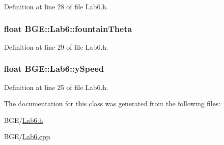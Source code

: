 Definition at line 28 of file Lab6.\-h.

\hypertarget{class_b_g_e_1_1_lab6_a15b7ff91181622d802d12b924c7b47ba}{
\subsubsection[{fountain\-Theta}]{\setlength{\rightskip}{0pt plus 5cm}float B\-G\-E\-::\-Lab6\-::fountain\-Theta}}\label{class_b_g_e_1_1_lab6_a15b7ff91181622d802d12b924c7b47ba}


Definition at line 29 of file Lab6.\-h.

\hypertarget{class_b_g_e_1_1_lab6_aaf30f90a1ae7641d70a128e1d1ba528f}{
\subsubsection[{y\-Speed}]{\setlength{\rightskip}{0pt plus 5cm}float B\-G\-E\-::\-Lab6\-::y\-Speed}}\label{class_b_g_e_1_1_lab6_aaf30f90a1ae7641d70a128e1d1ba528f}


Definition at line 25 of file Lab6.\-h.



The documentation for this class was generated from the following files\-:\begin{DoxyCompactItemize}
\item 
B\-G\-E/\hyperlink{_lab6_8h}{Lab6.\-h}\item 
B\-G\-E/\hyperlink{_lab6_8cpp}{Lab6.\-cpp}\end{DoxyCompactItemize}

